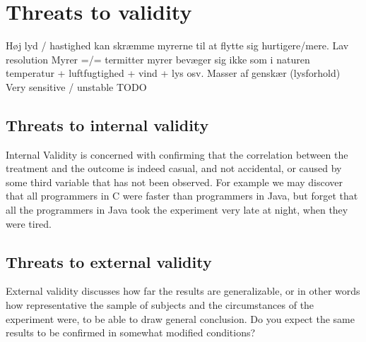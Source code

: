 
\section{Threats to validity}

Høj lyd / hastighed kan skræmme myrerne til at flytte sig hurtigere/mere.
Lav resolution
Myrer =/= termitter
myrer bevæger sig ikke som i naturen
temperatur + luftfugtighed + vind + lys osv.
Masser af genskær (lysforhold)
Very sensitive / unstable
TODO

\subsection{Threats to internal validity}
Internal Validity is concerned with confirming that the correlation between the treatment and the outcome is indeed casual, and not accidental, or caused by some third variable that has not been observed. For example we may discover that all programmers in C were faster than programmers in Java, but forget that all the programmers in Java took the experiment very late at night, when they were tired.

\subsection{Threats to external validity}
External validity discusses how far the results are generalizable, or in other words how representative the sample of subjects and the circumstances of the experiment were, to be able to draw general conclusion. Do you expect the same results to be confirmed in somewhat modified conditions?
